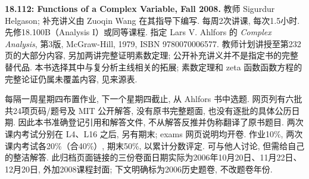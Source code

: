\noindent\textbf{18.112: Functions of a Complex Variable, Fall 2008.}
教师 Sigurdur Helgason; 补充讲义由 Zuoqin Wang 在其指导下编写. 每周2次讲课, 每次1.5小时. 先修18.100B（Analysis I）或同等课程. 指定 Lars V. Ahlfors 的 \textit{Complex Analysis}, 第3版, McGraw-Hill, 1979, ISBN 9780070006577. 教师计划讲授至第232页的大部分内容, 另加两讲完整证明素数定理; 公开补充讲义并不是指定书的完整替代品. 本书选择其中与复分析主线相关的拓展; 素数定理和 zeta 函数函数方程的完整论证仍属未覆盖内容, 见来源表.

每隔一周星期四布置作业, 下一个星期四截止, 从 Ahlfors 书中选题. 网页列有六批共24项页码/题号及 MIT 公开解答, 没有原书完整题面, 也没有逐批的具体公历日期. 因此本书准确登记引用和解答文件, 不从解答反推并伪称翻译了原书题目. 两次课内考试分别在 L4、L16 之后, 另有期末; exams 网页说明均开卷. 作业10\%, 两次课内考试各20\%（合40\%）, 期末50\%, 以累计分数评定. 可与他人讨论, 但需给自己的整洁解答. 此归档页面链接的三份卷面日期实际为2006年10月20日、11月22日、12月20日, 外加2008课程封面; 下文明确标为2006历史题卷, 不改题卷年份.

